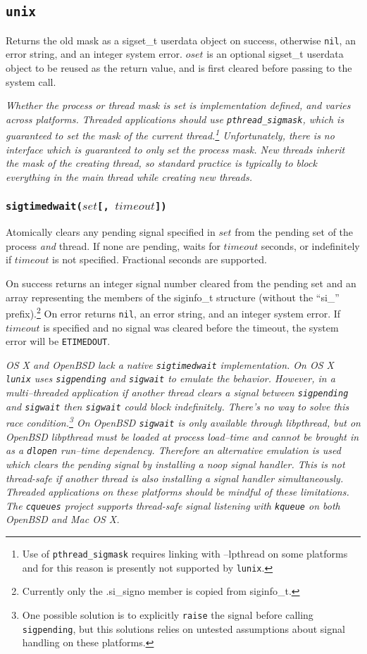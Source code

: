 \documentclass[11pt, oneside]{memoir}
\newcommand*{\lunix}[0]{\texttt{lunix}\xspace}
\newcommand*{\cqueues}[0]{\texttt{cqueues}\xspace}
\newcommand*{\nil}[0]{\texttt{nil}\xspace}
\newcommand*{\syscall}[1]{\texttt{#1}\xspace}
\newcommand*{\fn}[1]{\texttt{#1}\xspace}
\newcounter{toccols}
\newenvironment{Module}[1]{
	\subsection{\texttt{#1}}
	\addtocontents{toc}{
		\protect\begin{multicols}{\value{toccols}}
	}
}{
	\addtocontents{toc}{\protect\end{multicols}}
}
\begin{document}
\begin{Module}{unix}
Returns the old mask as a sigset\_t userdata object on success, otherwise \nil, an error string, and an integer system error. $oset$ is an optional sigset\_t userdata object to be reused as the return value, and is first cleared before passing to the system call.

\emph{Whether the process or thread mask is set is implementation defined, and varies across platforms. Threaded applications should use \syscall{pthread\_sigmask}, which is guaranteed to set the mask of the current thread.\footnote{Use of \syscall{pthread\_sigmask} requires linking with --lpthread on some platforms and for this reason is presently not supported by \lunix.} Unfortunately, there is no interface which is guaranteed to only set the process mask. New threads inherit the mask of the creating thread, so standard practice is typically to block everything in the main thread while creating new threads.}

\subsubsection[\fn{sigtimedwait}]{\fn{sigtimedwait($set$[, $timeout$])}}

Atomically clears any pending signal specified in $set$ from the pending set of the process \emph{and} thread. If none are pending, waits for $timeout$ seconds, or indefinitely if $timeout$ is not specified. Fractional seconds are supported.

On success returns an integer signal number cleared from the pending set and an array representing the members of the siginfo\_t structure (without the ``si\_'' prefix).\footnote{Currently only the .si\_signo member is copied from siginfo\_t.} On error returns \nil, an error string, and an integer system error. If $timeout$ is specified and no signal was cleared before the timeout, the system error will be \texttt{ETIMEDOUT}.

\emph{OS X and OpenBSD lack a native \syscall{sigtimedwait} implementation. On OS X \lunix uses \syscall{sigpending} and \syscall{sigwait} to emulate the behavior. However, in a multi--threaded application if another thread clears a signal between \syscall{sigpending} and \syscall{sigwait} then \syscall{sigwait} could block indefinitely. There's no way to solve this race condition.\footnote{One possible solution is to explicitly \syscall{raise} the signal before calling \syscall{sigpending}, but this solutions relies on untested assumptions about signal handling on these platforms.} On OpenBSD \syscall{sigwait} is only available through libpthread, but on OpenBSD libpthread must be loaded at process load--time and cannot be brought in as a \syscall{dlopen} run--time dependency. Therefore an alternative emulation is used which clears the pending signal by installing a noop signal handler. This is not thread-safe if another thread is also installing a signal handler simultaneously. Threaded applications on these platforms should be mindful of these limitations. The \cqueues project supports thread-safe signal listening with \syscall{kqueue} on both OpenBSD and Mac OS X.}


\end{Module}
\end{document}
